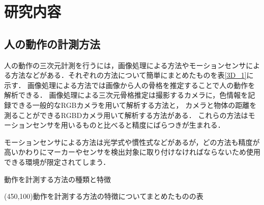\documentclass[titlepage]{jarticle}
\begin{document}
%
%
\section{研究内容}

%
%
\subsection{人の動作の計測方法}
%
人の動作の三次元計測を行うには，画像処理による方法やモーションセンサによる方法などがある．それぞれの方法について簡単にまとめたものを表\ref{3D_1}に示す．
画像処理による方法では画像から人の骨格を推定することで人の動作を解析できる．
画像処理による三次元骨格推定は撮影するカメラに，色情報を記録できる一般的なRGBカメラを用いて解析する方法と，
カメラと物体の距離を測ることができるRGBDカメラ用いて解析する方法がある．
これらの方法はモーションセンサを用いるものと比べると精度にばらつきが生まれる．

モーションセンサによる方法は光学式や慣性式などがあるが，どの方法も精度が高いかわりにマーカーやセンサを検出対象に取り付けなければならないため使用できる環境が限定されてしまう．

\begin{table}[t!]
  \centering
  \caption{動作を計測する方法の種類と特徴}
  \framebox(450,100){動作を計測する方法の特徴についてまとめたものの表}
  \label{3D_1}
\end{table}

\end{document}
